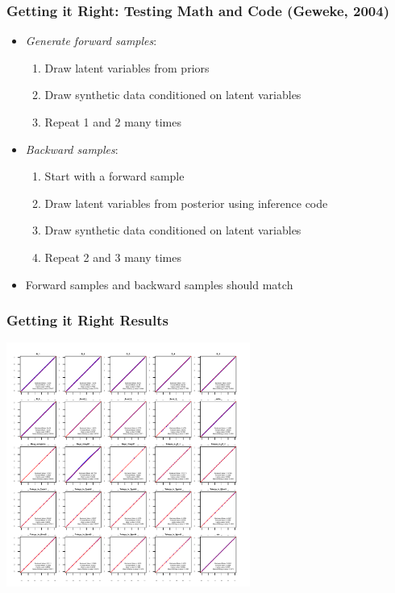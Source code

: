 \documentclass[10pt, xcolor=table]{beamer}
\theoremstyle{definition}
\theoremstyle{remark}
\begin{document}
\begin{frame} \frametitle{Getting it Right: Testing Math and Code
    (Geweke, 2004)}

\begin{itemize}
\item {\em Generate forward samples}:
\begin{enumerate}
\item Draw latent variables from priors
\item Draw synthetic data conditioned on latent variables
  \item Repeat 1 and 2 many times
\end{enumerate} \vspace{.2cm}
\item {\em Backward samples}:
\begin{enumerate}
\item Start with a forward sample
\item Draw latent variables from posterior using inference code
\item Draw synthetic data conditioned on latent variables
\item Repeat 2 and 3 many times
\end{enumerate} \vspace{.2cm}
\item Forward samples and backward samples should match
\end{itemize}


\end{frame}

\begin{frame} \frametitle{Getting it Right Results}
\begin{center}
\includegraphics[width=0.6\textwidth]{./figures/GiReta}
\end{center}
\end{frame}
\end{document}
